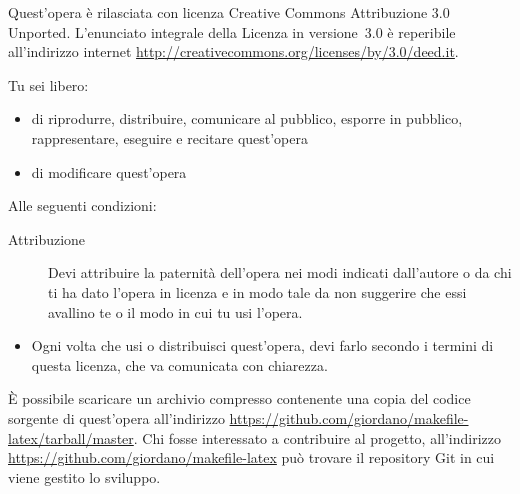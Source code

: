 \noindent Quest'opera è rilasciata con licenza Creative Commons Attribuzione 3.0
Unported.  L'enunciato integrale della Licenza in versione~3.0 è reperibile
all'indirizzo internet \url{http://creativecommons.org/licenses/by/3.0/deed.it}.

Tu sei libero:
\begin{itemize}
\item di riprodurre, distribuire, comunicare al pubblico, esporre in pubblico,
  rappresentare, eseguire e recitare quest'opera
\item di modificare quest'opera
\end{itemize}
Alle seguenti condizioni:
\begin{description}
\item[Attribuzione] Devi attribuire la paternità dell'opera nei modi indicati
  dall'autore o da chi ti ha dato l'opera in licenza e in modo tale da non
  suggerire che essi avallino te o il modo in cui tu usi l'opera.
\end{description}

\begin{itemize}
\item Ogni volta che usi o distribuisci quest'opera, devi farlo secondo i
  termini di questa licenza, che va comunicata con chiarezza.
\end{itemize}

\vfill

È possibile scaricare un archivio compresso contenente una copia del codice
sorgente di quest'opera all'indirizzo
\url{https://github.com/giordano/makefile-latex/tarball/master}.  Chi fosse
interessato a contribuire al progetto, all'indirizzo
\url{https://github.com/giordano/makefile-latex} può trovare il repository Git
in cui viene gestito lo sviluppo.

